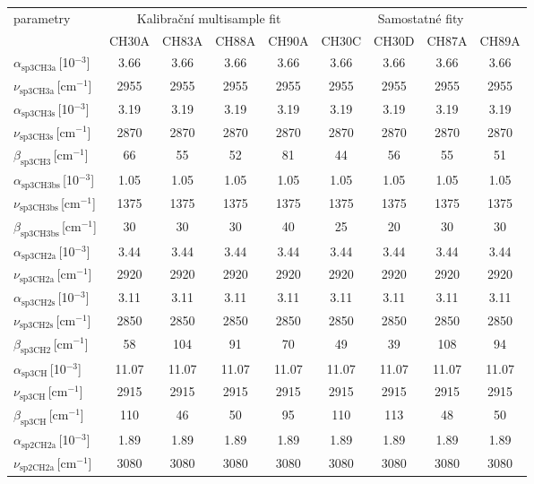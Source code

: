 \begin{tabular}{lcccccccc}
\hline
parametry & \multicolumn{4}{c}{Kalibrační multisample fit} & \multicolumn{4}{c}{Samostatné fity}\\
 & CH30A & CH83A & CH88A & CH90A & CH30C & CH30D & CH87A & CH89A\\
\hline
$\alpha_\mathrm{sp3CH3a}$\,[10$^{-3}$] & 3.66 & 3.66 & 3.66 & 3.66 & 3.66 & 3.66 & 3.66 & 3.66\\
$\nu_\mathrm{sp3CH3a}$\,[cm$^{-1}$] & 2955 & 2955 & 2955 & 2955 & 2955 & 2955 & 2955 & 2955\\
$\alpha_\mathrm{sp3CH3s}$\,[10$^{-3}$] & 3.19 & 3.19 & 3.19 & 3.19 & 3.19 & 3.19 & 3.19 & 3.19\\
$\nu_\mathrm{sp3CH3s}$\,[cm$^{-1}$] & 2870 & 2870 & 2870 & 2870 & 2870 & 2870 & 2870 & 2870\\
$\beta_\mathrm{sp3CH3}$\,[cm$^{-1}$] & 66 & 55 & 52 & 81 & 44 & 56 & 55 & 51\\
$\alpha_\mathrm{sp3CH3bs}$\,[10$^{-3}$] & 1.05 & 1.05 & 1.05 & 1.05 & 1.05 & 1.05 & 1.05 & 1.05\\
$\nu_\mathrm{sp3CH3bs}$\,[cm$^{-1}$] & 1375 & 1375 & 1375 & 1375 & 1375 & 1375 & 1375 & 1375\\
$\beta_\mathrm{sp3CH3bs}$\,[cm$^{-1}$] & 30 & 30 & 30 & 40 & 25 & 20 & 30 & 30\\
$\alpha_\mathrm{sp3CH2a}$\,[10$^{-3}$]& 3.44 & 3.44 & 3.44 & 3.44 & 3.44 & 3.44 & 3.44 & 3.44\\
$\nu_\mathrm{sp3CH2a}$\,[cm$^{-1}$] & 2920 & 2920 & 2920 & 2920 & 2920 & 2920 & 2920 & 2920\\
$\alpha_\mathrm{sp3CH2s}$\,[10$^{-3}$] & 3.11 & 3.11 & 3.11 & 3.11 & 3.11 & 3.11 & 3.11 & 3.11\\
$\nu_\mathrm{sp3CH2s}$\,[cm$^{-1}$] & 2850 & 2850 & 2850 & 2850 & 2850 & 2850 & 2850 & 2850\\
$\beta_\mathrm{sp3CH2}$\,[cm$^{-1}$] & 58 & 104 & 91 & 70 & 49 & 39 & 108 & 94\\
$\alpha_\mathrm{sp3CH}$\,[10$^{-3}$] & 11.07 & 11.07 & 11.07 & 11.07 & 11.07 & 11.07 & 11.07 & 11.07\\
$\nu_\mathrm{sp3CH}$\,[cm$^{-1}$] & 2915 & 2915 & 2915 & 2915 & 2915 & 2915 & 2915 & 2915\\
$\beta_\mathrm{sp3CH}$\,[cm$^{-1}$] & 110 & 46 & 50 & 95 & 110 & 113 & 48 & 50\\
$\alpha_\mathrm{sp2CH2a}$\,[10$^{-3}$] & 1.89 & 1.89 & 1.89 & 1.89 & 1.89 & 1.89 & 1.89 & 1.89\\
$\nu_\mathrm{sp2CH2a}$\,[cm$^{-1}$] & 3080 & 3080 & 3080 & 3080 & 3080 & 3080 & 3080 & 3080\\

\end{tabular}
